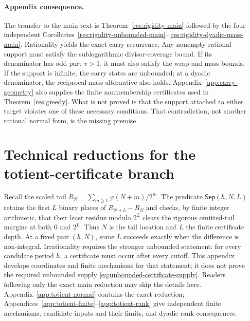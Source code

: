 \documentclass[11pt]{article}
\theoremstyle{definition}
\theoremstyle{remark}
\newcommand{\ph}{\varphi}
\begin{document}
\paragraph{Appendix consequence.}
The transfer to the main text is Theorem~\ref{res:rigidity-main} followed by
the four independent
Corollaries~\ref{res:rigidity-unbounded-main}--\ref{res:rigidity-dyadic-mass-main}.
Rationality yields the exact carry recurrence.  Any nonempty rational support
must satisfy the sublogarithmic divisor-coverage bound.  If its denominator
has odd part \(v>1\), it must also satisfy the wrap and mass bounds.  If the
support is infinite, the carry states are unbounded; at a dyadic denominator,
the reciprocal-mass alternative also holds.
Appendix~\ref{app:carry-geometry} also supplies the finite nonmembership certificates
used in Theorem~\ref{res:greedy}.  What is not proved is that the support attached to
either target violates one of these necessary conditions.  That
contradiction, not another rational normal form, is the missing premise.

\section{Technical reductions for the totient-certificate branch}
\label{app:totient-technical}

Recall the scaled tail
\(R_N=\sum_{m\geq1}\ph(N+m)/2^m\).
The predicate \(\mathsf{Sep}(h,N,L)\) retains the first $L$ binary places of
\(R_{N+h}-R_N\) and checks, by finite integer arithmetic, that their least
residue modulo $2^L$ clears the rigorous omitted-tail margins at both $0$
and $2^L$.  Thus $N$ is the tail location and $L$ the finite certificate
depth.  At a fixed pair \((h,N)\), some $L$ succeeds exactly when the
difference is non-integral.  Irrationality requires the stronger unbounded statement: for
every candidate period \(h\), a certificate must occur after every cutoff.
This appendix develops coordinates and finite mechanisms for that statement;
it does not prove the required unbounded supply
\eqref{eq:unbounded-certificate-supply}.
Readers following only the exact main reduction may skip the details here.
Appendix~\ref{app:totient-normal} contains the exact reduction;
Appendices~\ref{app:totient-finite}--\ref{app:totient-rank} give independent
finite mechanisms, candidate inputs and their limits, and dyadic-rank
consequences.
\end{document}
